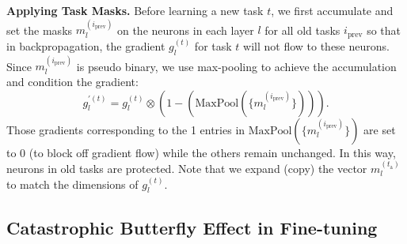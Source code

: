 \documentclass[11pt]{article}
\begin{document}
\textbf{Applying Task Masks.}
Before learning a new task $t$, we first accumulate and set the masks $m^{(i_{\text{prev}})}_l$ on the neurons in each layer $l$ for all old tasks $i_{\text{prev}}$
so that in backpropagation, the gradient $g^{(t)}_l$ for task $t$ will not flow to these neurons. 
Since $m^{(i_{\text{prev}})}_l$ is {pseudo} binary, we use 
max-pooling to achieve the accumulation and condition the gradient:  
\begin{equation}
\label{eq:gradient}
g^{'(t)}_l = g^{(t)}_l \otimes (1-(\text{MaxPool}(\{m^{(i_{\text{prev}})}_l\}))).
\end{equation}
Those gradients corresponding to the 1 entries in $\text{MaxPool}(\{m^{(i_{\text{prev}})}_l\})$ are set to 0 (to block off gradient flow) while the others remain unchanged. 
In this way, neurons in old tasks are protected. Note that we expand (copy) the vector $m_l^{(t_{\text{a}})}$ to match the dimensions of $g_l^{(t)}$.

















\subsection{Catastrophic Butterfly Effect in Fine-tuning}
\label{sec:butterfly}
\end{document}
